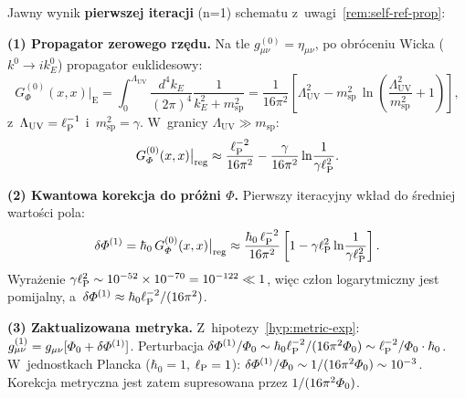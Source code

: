 \begin{proposition}%
\label{prop:first-iteration}
Jawny wynik \textbf{pierwszej iteracji} (n=1) schematu
z~uwagi~\ref{rem:self-ref-prop}:

\medskip
\noindent\textbf{(1) Propagator zerowego rzędu.}
Na tle $g_{\mu\nu}^{(0)} = \eta_{\mu\nu}$, po obróceniu Wicka
($k^0 \to ik_E^0$) propagator euklidesowy:
\begin{equation}\label{eq:prop-eucl}
    G_\Phi^{(0)}(x,x)\big|_{\mathrm{E}}
    = \int_0^{\Lambda_{\mathrm{UV}}} \frac{d^4k_E}{(2\pi)^4}
      \frac{1}{k_E^2 + m_{\mathrm{sp}}^2}
    = \frac{1}{16\pi^2}
      \left[\Lambda_{\mathrm{UV}}^2 - m_{\mathrm{sp}}^2\,
      \ln\!\left(\frac{\Lambda_{\mathrm{UV}}^2}{m_{\mathrm{sp}}^2} + 1\right)\right],
\end{equation}
z~$\Lambda_{\mathrm{UV}} = \ell_{\mathrm{P}}^{-1}$ i~$m_{\mathrm{sp}}^2 = \gamma$.
W~granicy $\Lambda_{\mathrm{UV}} \gg m_{\mathrm{sp}}$:
\begin{equation}\label{eq:prop-approx}
    G_\varPhi^{(0)}(x,x)\big|_{\mathrm{reg}}
    \approx \frac{\ell_{\mathrm{P}}^{-2}}{16\pi^2}
    - \frac{\gamma}{16\pi^2}\ln\!\frac{1}{\gamma\ell_{\mathrm{P}}^2}.
\end{equation}

\noindent\textbf{(2) Kwantowa korekcja do próżni $\Phi$.}
Pierwszy iteracyjny wkład do średniej wartości pola:
\begin{equation}\label{eq:Phi-1st-corr}
    \delta\varPhi^{(1)} = \hbar_0\,G_\varPhi^{(0)}(x,x)\big|_{\mathrm{reg}}
    \approx \frac{\hbar_0\,\ell_{\mathrm{P}}^{-2}}{16\pi^2}
    \left[1 - \gamma\ell_{\mathrm{P}}^2\ln\!\frac{1}{\gamma\ell_{\mathrm{P}}^2}\right].
\end{equation}
Wyrażenie $\gamma\ell_{\mathrm{P}}^2 \sim 10^{-52}\times 10^{-70} = 10^{-122} \ll 1$,
więc człon logarytmiczny jest pomijalny, a~$\delta\varPhi^{(1)}
\approx \hbar_0\ell_{\mathrm{P}}^{-2}/(16\pi^2)$.

\noindent\textbf{(3) Zaktualizowana metryka.}
Z~hipotezy~\ref{hyp:metric-exp}: $g_{\mu\nu}^{(1)} =
g_{\mu\nu}[\varPhi_0 + \delta\varPhi^{(1)}]$.
Perturbacja $\delta\varPhi^{(1)}/\varPhi_0 \sim \hbar_0 \ell_{\mathrm{P}}^{-2}/(16\pi^2\varPhi_0)
\sim \ell_{\mathrm{P}}^{-2}/\varPhi_0 \cdot \hbar_0$.
W~jednostkach Plancka ($\hbar_0 = 1$, $\ell_{\mathrm{P}} = 1$):
$\delta\varPhi^{(1)}/\varPhi_0 \sim 1/(16\pi^2\varPhi_0) \sim 10^{-3}$.
Korekcja metryczna jest zatem supresowana przez $1/(16\pi^2\varPhi_0)$.


\end{proposition}
